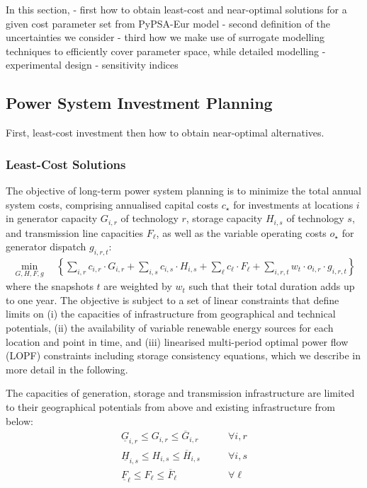 In this section,
- first how to obtain least-cost and near-optimal solutions for a given cost parameter set from PyPSA-Eur model
- second definition of the uncertainties we consider
- third how we make use of surrogate modelling techniques to efficiently cover parameter space,
  while detailed modelling
- experimental design
- sensitivity indices

\subsection{Power System Investment Planning}
\label{sec:model}

First, least-cost investment then how to obtain near-optimal alternatives.

\subsubsection{Least-Cost Solutions}

The objective of long-term power system planning is to minimize the total
annual system costs, comprising annualised capital costs $c_\star$ for investments at locations $i$
in generator capacity $G_{i,r}$ of technology $r$, storage capacity $H_{i,s}$ of technology $s$, and transmission line capacities
$F_{\ell}$, as well as the variable operating costs $o_\star$ for generator dispatch $g_{i,r,t}$:
\begin{align}
    \min_{G,H,F,g} \quad \left\{
        \sum_{i,r} c_{i,r}\cdot G_{i,r} +
        \sum_{i,s} c_{i,s}\cdot H_{i,s} +
        \sum_{\ell}c_{\ell}\cdot F_{\ell}+
        \sum_{i,r,t}w_t\cdot o_{i,r} \cdot g_{i,r,t}
    \right\}
    \label{eq:objective}
\end{align}
where the snapshots $t$ are weighted by $w_t$ such that their total duration
adds up to one year. The objective is subject to a set of linear constraints that define limits on
(i) the capacities of infrastructure from geographical and technical potentials,
(ii) the availability of variable renewable energy sources for each location and point in time, and
(iii) linearised multi-period optimal power flow (LOPF) constraints including storage consistency equations,
which we describe in more detail in the following.

The capacities of generation, storage and transmission infrastructure are
limited to their geographical potentials from above and existing infrastructure from below:
\begin{align}
    \label{eq:firstA}
    \underline{G}_{i,r}  \leq G_{i,r}  \leq \overline{G}_{i,r}  &\qquad\forall i, r \\
    \underline{H}_{i,s}  \leq H_{i,s}  \leq \overline{H}_{i,s}  &\qquad\forall i, s \\
    \underline{F}_{\ell} \leq F_{\ell} \leq \overline{F}_{\ell} &\qquad\forall \ell
\end{align}


